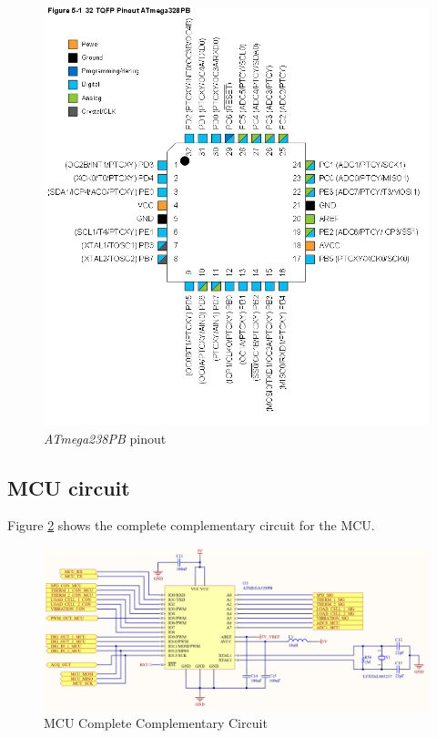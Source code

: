 		\begin{figure}[htbp]
			\centering
			\includegraphics[scale=0.7]{figuras/fig-atmega328pb.png}
			\caption{\textit{ATmega238PB} pinout \cite{atmega328p-datasheet}}
			\label{fig:atmega328pb}
		\end{figure}
		

		\subsection{MCU circuit}\label{ssec:mcu-circuit}

		Figure \ref{fig:mcu-circuit} shows the complete complementary circuit for the MCU.

		\begin{figure}[htbp]
			\centering
			\includegraphics[scale=0.7]{figuras/fig-mcu-circuit.png}
			\caption{MCU Complete Complementary Circuit \cite{mcu-circuit}}
			\label{fig:mcu-circuit}
		\end{figure}

